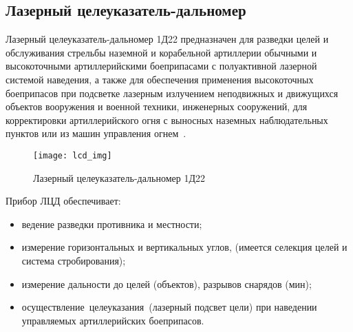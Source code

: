 \subsection{Лазерный целеуказатель-дальномер}
Лазерный целеуказатель-дальномер 1Д22 предназначен для разведки целей и обслуживания стрельбы наземной и корабельной
артиллерии обычными и высокоточными артиллерийскими боеприпасами с полуактивной лазерной системой наведения, а
также для обеспечения применения высокоточных боеприпасов при подсветке лазерным излучением неподвижных и движущихся объектов
вооружения и военной техники, инженерных сооружений, для корректировки артиллерийского огня с выносных наземных наблюдательных
пунктов или из машин управления огнем~\cite{lcd}.
\label{sub:lit_review:lcd}
\begin{figure}[h]
	\centering
	\texttt{[image: lcd\_img]}
	\caption{Лазерный целеуказатель-дальномер 1Д22~\cite{lcd}}
	\label{fig:lit_reiview:lcd:lcd_img}
\end{figure}

Прибор ЛЦД обеспечивает: 
\begin{itemize}
	\item ведение разведки противника и местности;
	\item измерение горизонтальных и вертикальных углов, (имеется селекция целей и система стробирования);
	\item измерение дальности до целей (объектов), разрывов снарядов (мин);
	\item осуществление целеуказания (лазерный подсвет цели) при наведении управляемых артиллерийских боеприпасов.
\end{itemize}
